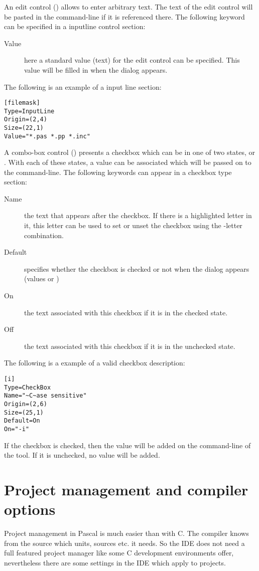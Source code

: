 An edit control () allows to enter arbitrary text.
The text of the edit control will be pasted in the command-line if it
is referenced there. The following keyword can be specified in a
inputline control section:
\begin{description}
\item[Value] here a standard value (text) for the edit control can be
specified. This value will be filled in when the dialog appears.
\end{description}
The following is an example of a input line section:
\begin{verbatim}
[filemask]
Type=InputLine
Origin=(2,4)
Size=(22,1)
Value="*.pas *.pp *.inc"
\end{verbatim}

A combo-box control () presents a checkbox which
can be in one of two states,  or . With each of
these states, a value can be associated which will be passed on to
the command-line. The following keywords can appear in a checkbox
type section:
\begin{description}
\item[Name] the text that appears after the checkbox.
If there is a highlighted letter in it, this letter can be used
to set or unset the checkbox using the -letter combination.
\item[Default] specifies whether the checkbox is checked or not when
the dialog appears (values  or )
\item[On] the text associated with this checkbox if it is in the checked
state.
\item[Off] the text associated with this checkbox if it is in the
unchecked state.
\end{description}
The following is a example of a valid checkbox description:
\begin{verbatim}
[i]
Type=CheckBox
Name="~C~ase sensitive"
Origin=(2,6)
Size=(25,1)
Default=On
On="-i"
\end{verbatim}
If the checkbox is checked, then the value  will be added on
the command-line of the tool. If it is unchecked, no value will be added.

\section{Project management and compiler options}
\label{se:projectmanagement}
Project management in Pascal is much easier than with C. The
compiler knows from the source which units, sources etc. it needs.
So the \fpc IDE does not need a full featured project manager like
some C development environments offer, nevertheless there are some
settings in the IDE which apply to projects.
%
%
